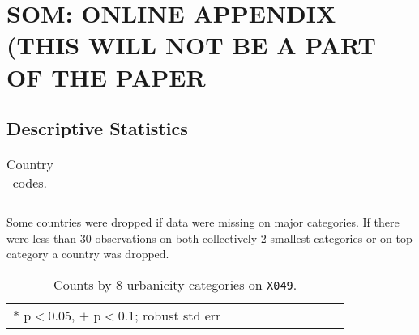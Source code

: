 \documentclass[11pt, letterpaper]{article}
\begin{document}



\section*{SOM: ONLINE APPENDIX (THIS WILL NOT BE A PART OF THE PAPER}

\subsection*{Descriptive Statistics}

\begin{spacing}{.9} \begin{table}[H]\centering  \label{d1} \begin{scriptsize} \begin{tabular}{lllll}\hline
                                                                                        
                                                                                        \hline
                                                                                      \end{tabular}\end{scriptsize}\caption{Country codes.}\end{table} \end{spacing}
        
Some countries were dropped if data were missing on major categories. If there
were less than
30 observations on both collectively 2 smallest categories or on top category a country
was dropped. %

\begin{spacing}{.9} \begin{table}[H]\centering  \label{d1} \begin{scriptsize} \begin{tabular}{llllllllll}\hline  \hline * p$<$0.05, $+$ p$<$0.1; robust std err \end{tabular}\end{scriptsize}\caption{Counts by 8 urbanicity categories on \texttt{X049}.}\end{table} \end{spacing}
\end{document}
